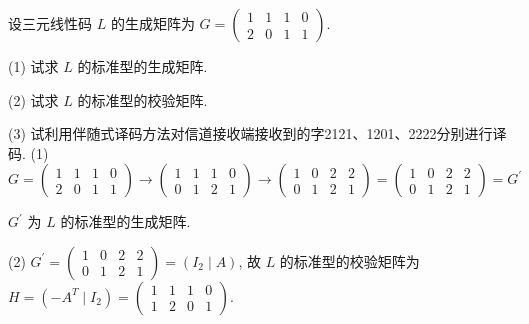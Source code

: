 \newpage
 \begin{tcolorbox}[breakable,colback=blue!5!white,colframe=blue!75!black,
 title= 解答题]

设三元线性码 $ L $ 的生成矩阵为
$
G=\left(\begin{array}{llll}
1 & 1 & 1 & 0 \\
2 & 0 & 1 & 1
\end{array}\right) .
$

(1) 试求 $ L $ 的标准型的生成矩阵.

(2) 试求 $ L $ 的标准型的校验矩阵.

(3) 试利用伴随式译码方法对信道接收端接收到的字2121、1201、2222分别进行译码.
\tcblower
(1)
$
 G=\left(\begin{array}{llll}
1 & 1 & 1 & 0 \\
2 & 0 & 1 & 1
\end{array}\right) \rightarrow\left(\begin{array}{llll}
1 & 1 & 1 & 0 \\
0 & 1 & 2 & 1
\end{array}\right) \rightarrow\left(\begin{array}{llll}
1 & 0 & 2 & 2 \\
0 & 1 & 2 & 1
\end{array}\right)=\left(\begin{array}{ll|ll}
1 & 0 & 2 & 2 \\
0 & 1 & 2 & 1
\end{array}\right)=G^{\prime}
$

$ G^{\prime} $ 为 $ L $ 的标准型的生成矩阵.


(2) $ G^{\prime}=\left(\begin{array}{ll|ll}1 & 0 & 2 & 2 \\ 0 & 1 & 2 & 1\end{array}\right)=\left(I_{2} \mid A\right) $, 故 $ L $ 的标准型的校验矩阵为 $H= \left(-A^{T} \mid I_{2}\right)=\left(\begin{array}{llll}1 & 1 & 1 & 0 \\ 1 & 2 & 0 & 1\end{array}\right)$. 


\end{tcolorbox}

